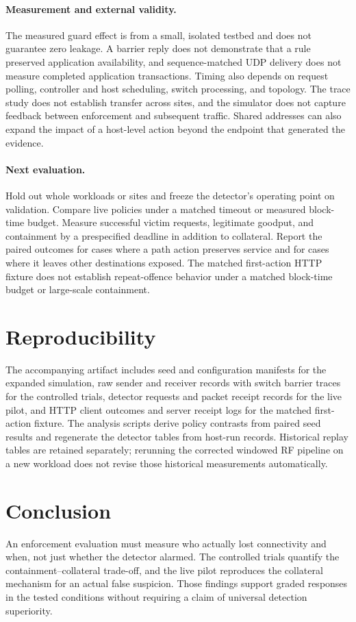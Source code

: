 \documentclass[conference]{IEEEtran}
\begin{document}
\paragraph{Measurement and external validity.}
The measured guard effect is from a small, isolated testbed and does not
guarantee zero leakage. A barrier reply does not demonstrate that a rule
preserved application availability, and sequence-matched UDP delivery does
not measure completed application transactions. Timing also depends on
request polling, controller and host scheduling, switch processing, and
topology. The trace study does not establish transfer across sites, and the
simulator does not capture feedback between enforcement and subsequent
traffic. Shared addresses can also expand the impact of a host-level action
beyond the endpoint that generated the evidence.

\paragraph{Next evaluation.}
Hold out whole workloads or sites and freeze the detector's operating point
on validation. Compare live policies under a matched timeout or measured
block-time budget. Measure successful victim requests, legitimate goodput,
and containment by a prespecified deadline in addition to collateral.
Report the paired outcomes for cases where a path action preserves service
and for cases where it leaves other destinations exposed. The matched first-action HTTP fixture does not establish repeat-offence
behavior under a matched block-time budget or large-scale containment.

\section{Reproducibility}
The accompanying artifact includes seed and configuration manifests for the
expanded simulation, raw sender and receiver records with switch barrier
traces for the controlled trials, detector requests and packet receipt
records for the live pilot, and HTTP client outcomes and server receipt logs
for the matched first-action fixture. The analysis scripts derive policy contrasts from
paired seed results and regenerate the detector tables from host-run records.
Historical replay tables are retained separately; rerunning the corrected
windowed RF pipeline on a new workload does not revise those historical
measurements automatically.

\section{Conclusion}
An enforcement evaluation must measure who actually lost connectivity and when,
not just whether the detector alarmed. The controlled trials quantify the
containment--collateral trade-off, and the live pilot reproduces the collateral
mechanism for an actual false suspicion. Those findings support graded responses
in the tested conditions without requiring a claim of universal detection
superiority.
\end{document}
